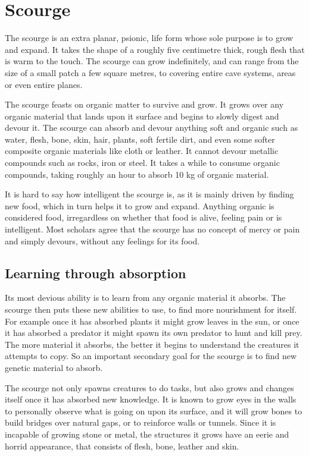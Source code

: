 \section{Scourge}

The scourge is an extra planar, psionic, life form whose sole purpose is to
grow and expand. It takes the shape of a roughly five centimetre thick, rough
flesh that is warm to the touch. The scourge can grow indefinitely, and can
range from the size of a small patch a few square metres, to covering entire
cave systems, areas or even entire planes.

The scourge feasts on organic matter to survive and grow. It grows over any
organic material that lands upon it surface and begins to slowly digest and
devour it. The scourge can absorb and devour anything soft and organic such as
water, flesh, bone, skin, hair, plants, soft fertile dirt, and even some
softer composite organic materials like cloth or leather. It cannot devour
metallic compounds such as rocks, iron or steel. It takes a while to consume
organic compounds, taking roughly an hour to absorb 10 kg of organic material.

It is hard to say how intelligent the scourge is, as it is mainly driven by
finding new food, which in turn helps it to grow and expand. Anything organic
is considered food, irregardless on whether that food is alive, feeling pain
or is intelligent. Most scholars agree that the scourge has no concept of
mercy or pain and simply devours, without any feelings for its food.

\subsection{Learning through absorption}

Its most devious ability is to learn from any organic material it absorbs. The
scourge then puts these new abilities to use, to find more nourishment for
itself. For example once it has absorbed plants it might grow leaves in the
sun, or once it has absorbed a predator it might spawn its own predator to
hunt and kill prey. The more material it absorbs, the better it begins to
understand the creatures it attempts to copy. So an important secondary goal
for the scourge is to find new genetic material to absorb.

The scourge not only spawns creatures to do tasks, but also grows and changes
itself once it has absorbed new knowledge. It is known to grow eyes in the
walls to personally observe what is going on upon its surface, and it will
grow bones to build bridges over natural gaps, or to reinforce walls or
tunnels. Since it is incapable of growing stone or metal, the structures it
grows have an eerie and horrid appearance, that consists of flesh, bone,
leather and skin.

